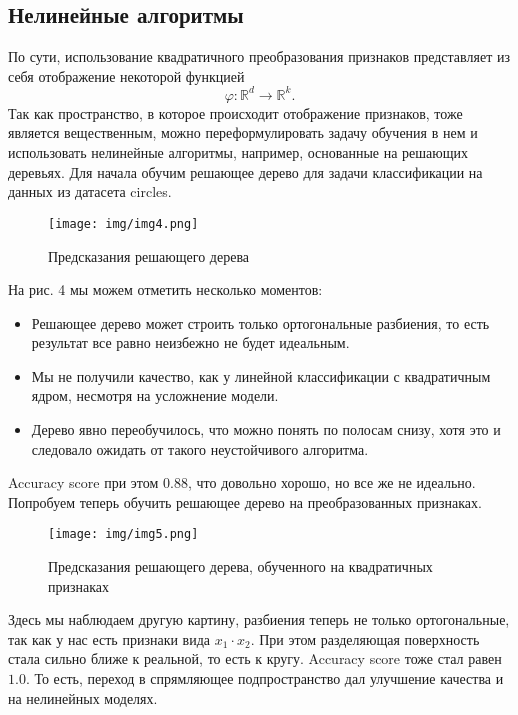 \documentclass[twoside,twocolumn]{article}
\theoremstyle{plain}
\theoremstyle{definition}
\begin{document}
\subsection{Нелинейные алгоритмы}
По сути, использование квадратичного преобразования признаков представляет из себя отображение некоторой функцией
$$
\varphi : \mathbb{R}^d \rightarrow \mathbb{R}^k.
$$
Так как пространство, в которое происходит отображение признаков, тоже является вещественным, можно переформулировать задачу обучения в нем и использовать
нелинейные алгоритмы, например, основанные на решающих деревьях. Для начала обучим решающее дерево для задачи классификации на данных из датасета circles.
\begin{figure}[!h]
  \caption{Предсказания решающего дерева}
  \centering
  \texttt{[image: img/img4.png]}
  \label{fig:circles4}
\end{figure}
На рис. 4 мы можем отметить несколько моментов:
\begin{itemize}
  \item Решающее дерево может строить только ортогональные разбиения, то есть результат все равно неизбежно не будет идеальным.
  \item Мы не получили качество, как у линейной классификации с квадратичным ядром, несмотря на усложнение модели.
  \item Дерево явно переобучилось, что можно понять по полосам снизу, хотя это и следовало ожидать от такого неустойчивого алгоритма.
\end{itemize}
Accuracy score при этом $0.88$, что довольно хорошо, но все же не идеально. Попробуем теперь обучить решающее дерево на
преобразованных признаках.
\begin{figure}[!h]
  \caption{Предсказания решающего дерева, обученного на квадратичных признаках}
  \centering
  \texttt{[image: img/img5.png]}
  \label{fig:circles5}
\end{figure}
Здесь мы наблюдаем другую картину, разбиения теперь не только ортогональные, так как у нас есть признаки вида $x_1 \cdot x_2$.
При этом разделяющая поверхность стала сильно ближе к реальной, то есть к кругу. Accuracy score тоже стал равен $1.0$. То есть, переход
в спрямляющее подпространство дал улучшение качества и на нелинейных моделях.
\end{document}
